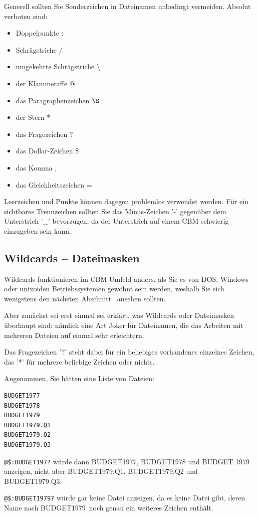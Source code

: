 \documentclass[10pt,a4paper]{scrartcl}		%
\begin{document}
Generell sollten Sie Sonderzeichen in Dateinamen unbedingt 
vermeiden. Absolut verboten sind:
\begin{itemize}
\item Doppelpunkte :
\item Schrägstriche /
\item umgekehrte Schrägstriche \textbackslash
\item der Klammeraffe @
\item das Paragraphenzeichen $\S$
\item der Stern *
\item das Fragezeichen ? 
\item das Dollar-Zeichen \$
\item das Komma ,
\item das Gleichheitszeichen =
\end{itemize}
Leerzeichen und Punkte können dagegen problemlos verwendet werden.
Für ein sichtbares Trennzeichen sollten Sie das Minus-Zeichen '-' gegenüber
dem Unterstrich '\_' bevorzugen, da der Unterstrich auf einem CBM schwierig
einzugeben sein kann.

\subsection{Wildcards -- Dateimasken}
Wildcards funktionieren im CBM-Umfeld anders, als Sie es von DOS,
Windows oder unixoiden Betriebssystemen gewöhnt sein werden, weshalb 
Sie sich wenigstens den nächsten Abschnitt \glqq {}\grqq\ 
ansehen sollten.

Aber zunächst sei erst einmal sei erklärt, was Wildcards oder Dateimasken 
überhaupt sind: nämlich
eine Art Joker für Dateinamen, die das Arbeiten mit mehreren Dateien
auf einmal sehr erleichtern.

Das Fragezeichen '?' steht dabei für ein beliebiges vorhandenes einzelnes 
Zeichen, das '*' für mehrere beliebige Zeichen oder nichts.

Angenommen, Sie hätten eine Liste von Dateien:

\begin{verbatim}
BUDGET1977
BUDGET1978
BUDGET1979
BUDGET1979.Q1
BUDGET1979.Q2
BUDGET1979.Q3
\end{verbatim}

\texttt{@\$:BUDGET197?} würde dann BUDGET1977, BUDGET1978 und BUDGET 1979
anzeigen, nicht aber BUDGET1979.Q1, BUDGET1979.Q2 und BUDGET1979.Q3.

\texttt{@\$:BUDGET1979?} würde gar keine Datei anzeigen, da es keine
Datei gibt, deren Name nach \glqq BUDGET1979\grqq\ noch genau ein
weiteres Zeichen enthält.
\end{document}
